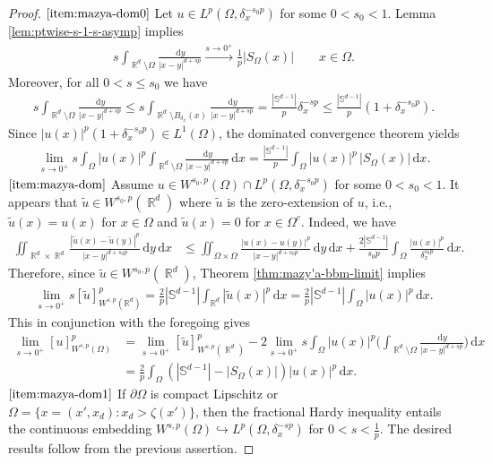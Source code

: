 \documentclass[12pt, reqno]{amsart}%
\theoremstyle{plain}  %
\theoremstyle{definition}  %
\theoremstyle{remark}
\numberwithin{equation}{section}
\DeclareMathOperator{\R}{\mathbb{R}}
\renewcommand{\d}{\,\mathrm{d}}
\begin{document}
\begin{proof}
$\eqref{item:mazya-dom0}$ Let $u\in L^p(\Omega, \delta_x^{-s_0p})$ for some $0<s_0<1$. Lemma \ref{lem:ptwise-s-1-s-asymp} implies 
\begin{align*}
 s \int_{\R^d \setminus \Omega} \frac{\d y}{|x-y|^{d+sp}} \xrightarrow{s\to0^+} \frac{1}{p}|S_\Omega(x)|\qquad x\in \Omega.
\end{align*}
Moreover,  for all $0<s\leq s_0$ we have
\begin{align*}
s \int_{\R^d \setminus \Omega} \frac{\d y}{|x-y|^{d+sp}}\leq s \int_{\R^d \setminus B_{\delta_x}(x)} \frac{\d y}{|x-y|^{d+sp}}= \frac{|\mathbb{S}^{d-1}|}{p}\delta_x^{-sp}
\leq \frac{|\mathbb{S}^{d-1}|}{p}(1+\delta_x^{-s_0p}).
\end{align*}
Since $|u(x)|^p(1+\delta_x^{-s_0p})\in L^1(\Omega)$, the dominated convergence theorem yields
\begin{align*}
\lim_{s\to0^+}
s \int_{\Omega} |u(x)|^p
\int_{\R^d \setminus \Omega}
\frac{\d y }{|x-y|^{d+sp}}  \d x=\frac{|\mathbb{S}^{d-1}|}{p}
 \int_{\Omega}
|u(x)|^p\,  |S_\Omega(x)|  \d x.
\end{align*}
$\eqref{item:mazya-dom}$ Assume $u\in W^{s_0,p}(\Omega)\cap L^p(\Omega, \delta_x^{-s_0p})$ for some $0<s_0<1$. It appears that $\widetilde{u}\in W^{s_0,p}(\R^d)$ where $\widetilde{u}$ is the  zero-extension of $u$, i.e., $\widetilde{u}(x)= u(x)$ for $x\in \Omega$ and $\widetilde{u}(x)=0$ for $x\in \Omega^c$.  Indeed, we have
\begin{align*}
\iint_{\R^d \times \R^d}
\frac{|\widetilde{u}(x) - \widetilde{u}(y)|^p}{|x-y|^{d+s_0p}} \d y \d x
&\leq \iint_{\Omega \times \Omega}
\frac{|u(x) - u(y)|^p}{|x-y|^{d+s_0p}} \d y \d x
+ \frac{2 |\mathbb{S}^{d-1}|}{s_0p}\int_{\Omega} \frac{|u(x)|^p}{\delta_x^{s_0p}}\d x.
\end{align*}
Therefore, since $\widetilde{u}\in W^{s_0,p}(\R^d)$, Theorem  \ref{thm:mazy'a-bbm-limit} implies
\begin{align*}
\lim_{s \to 0^+} s [\widetilde{u}]^p_{W^{s,p}(\mathbb{R}^d)}
= \frac{2}{p}|\mathbb{S}^{d-1}|
\int_{\R^d} |\widetilde{u}(x)|^p \d x=  \frac{2}{p}|\mathbb{S}^{d-1}|
\int_{\Omega} |u(x)|^p \d x.
\end{align*}
This in conjunction with the foregoing gives
\begin{align*}
\lim_{s\to 0^+} [u]^p_{W^{s,p}(\Omega)}
&= \lim_{s\to 0^+} [\widetilde{u}]^p_{W^{s,p}(\R^d)}-2\lim_{s\to 0^+}s \int_{\Omega} |u(x)|^p
\Big( \int_{\R^d \setminus \Omega}
\frac{\d y}{|x-y|^{d+sp}}  \Big) \d x\\
&= \frac{2}{p}\int_\Omega  (|\mathbb{S}^{d-1}|- |S_\Omega(x)| )|u(x)|^p\d x.
\end{align*}
$\eqref{item:mazya-dom1}$ If $\partial\Omega$ is compact Lipschitz or $\Omega=\{x= (x',x_d): x_d>\zeta(x')\}$, then
the fractional Hardy inequality \cite{Dyd04, AJR26}   entails the continuous embedding  $W^{s,p}(\Omega)\hookrightarrow L^p(\Omega, \delta_x^{-sp})$  for $0<s<\frac{1}{p}$. The desired results follow from the previous assertion.
\medskip


\end{proof}
\end{document}
